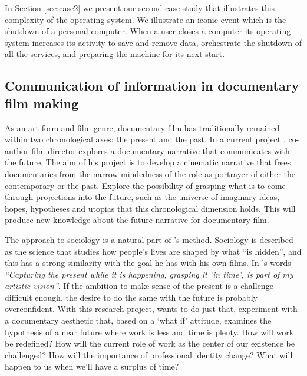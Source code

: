 \documentclass[manuscript,screen]{acmart}
\begin{document}
In Section \ref{sec:case2} we present our second case study that illustrates this complexity of the operating system. 
We illustrate an iconic event which is the shutdown of a personal computer. When a user closes a computer its operating system increases its activity to save and remove data, orchestrate the shutdown of all the services, and preparing the machine for its next start.

\subsection{Communication of information in documentary film making}\label{sec:documentary}

As an art form and film genre, documentary film has traditionally remained within two chronological axes: the present and the past. In a current project
, co-author film director  \Gandini explores a documentary narrative that communicates with the future. The aim of his project is to develop a cinematic narrative that frees documentaries from the narrow-mindedness of the role as portrayer of either the contemporary or the past. Explore the possibility of grasping what is to come through projections into the future, such as the universe of imaginary ideas, hopes, hypotheses and utopias that this chronological dimension holds. This will produce new knowledge about the future narrative for documentary film.

The approach to sociology is a natural part of \Gandini's method. Sociology is described as the science that studies how people's lives are shaped by what ``is hidden'', and this has a strong similarity with the goal he has with his own films. In \Gandini’s words \textit{``Capturing the present while it is happening, grasping it 'in time', is part of my artistic vision''}. If the ambition to make sense of the present is a challenge difficult enough, the desire to do the same with the future is probably overconfident. With this research project, \Gandini wants to do just that, experiment with a documentary aesthetic that, based on a ‘what if’ attitude, examines the hypothesis of a near future where work is less and time is plenty. How will work be redefined? How will the current role of work as the center of our existence be challenged? How will the importance of professional identity change? What will happen to us when we’ll have a surplus of time?
\end{document}

